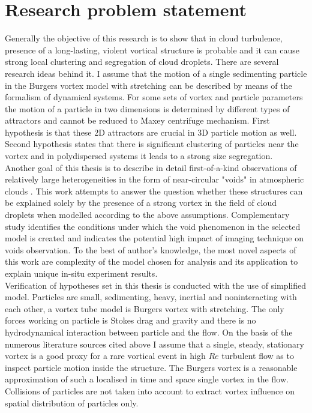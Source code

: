 \documentclass[../main.tex]{subfiles}
\begin{document}
\section{Research problem statement}
Generally the objective of this research is to show that in cloud turbulence, presence of a long-lasting, violent vortical structure is probable and it can cause strong local clustering and segregation of cloud droplets. There are several research ideas behind it.
I assume that the motion of a single sedimenting particle in the Burgers vortex model with stretching can be described by means of the formalism of dynamical systems. For some sets of vortex and particle parameters the motion of a particle in two dimensions is determined by different types of attractors and cannot be reduced to Maxey centrifuge mechanism. First hypothesis is that these 2D attractors are crucial in 3D particle motion as well. Second hypothesis states that there is significant clustering of particles near the vortex and in polydispersed systems it leads to a strong size segregation.\\
Another goal of this thesis is to describe in detail first-of-a-kind observations of relatively large heterogeneities in the form of near-circular "voids" in atmospheric clouds \citep{Xu2012}. This work attempts to answer the question whether these structures can be explained solely by the presence of a strong vortex in the field of cloud droplets when modelled according to the above assumptions. Complementary study identifies the conditions under which the void phenomenon in the selected model is created and indicates the potential high impact of imaging technique on voids observation. To the best of author's knowledge, the most novel aspects of this work are complexity of the model chosen for analysis and its application to explain unique in-situ experiment results.\\
Verification of hypotheses set in this thesis is conducted with the use of simplified model. Particles are small, sedimenting, heavy, inertial and noninteracting with each other, a vortex tube model is Burgers vortex with stretching. The only forces working on particle is Stokes drag and gravity and there is no hydrodynamical interaction between particle and the flow. On the basis of the numerous literature sources cited above I assume that a single, steady, stationary vortex is a good proxy for a rare vortical event in high $Re$ turbulent flow as to inspect particle motion inside the structure. The Burgers vortex is a reasonable approximation of such a localised in time and space single vortex in the flow. Collisions of particles are not taken into account to extract vortex influence on spatial distribution of particles only.\\
\end{document}
